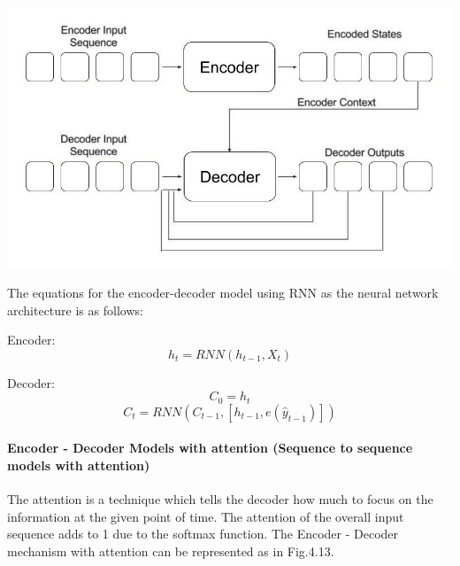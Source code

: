 				\begin{center}
				\includegraphics[width=\linewidth]{figures/Sequence-to-Sequence-Model.jpg}	
				\label{fig: Encoder - Decoder Mechanism}
				\end{center}

The equations for the encoder-decoder model using RNN as the neural network architecture is as follows:
 
Encoder: \begin{equation} h_{t} = RNN(h_{t-1}, X_{t}) \end{equation}

Decoder: \begin{equation} C_{0} = h_{t}  \end{equation}	
		 \begin{equation} C_{t} = RNN(C_{t-1}, [h_{t-1}, e(\hat{y}_{t-1})])  \end{equation}


\paragraph{Encoder - Decoder Models with attention (Sequence to sequence models with attention)}

The attention is a technique which tells the decoder how much to focus on the information at the given point of time. The attention of the overall input sequence adds to 1 due to the softmax function. The Encoder - Decoder mechanism with attention can be represented as in Fig.4.13.

